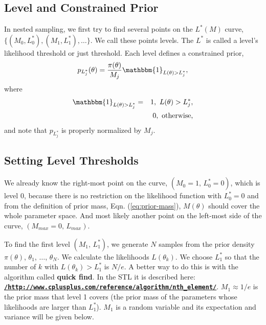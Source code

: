 \documentclass[letterpaper, preprint]{aastex}
\begin{document}
\subsection{Level and Constrained Prior}
In nested sampling, we first try to find several points on the $L^*(M)$ curve, $\{(M_0, L_0^*),(M_1,L_1^*),\ldots\}$. We call these points levels. The $L^*$ is called a level's likelihood threshold or just threshold. Each level defines a constrained prior,
\begin{equation} 
p_{L_j^*}(\theta) = \frac{\pi(\theta)}{M_j}\mathbbm{1}_{L(\theta)>L_j^*},
\label{eq:constrained-prior}
\end{equation}
where
\begin{eqnarray*}
\mathbbm{1}_{L(\theta)>L_j^*} &=& 1,\,\,L(\theta)>L_j^*,\\
& &0,\,\,\mathrm{otherwise},
\end{eqnarray*}
and note that $p_{L_j^*}$ is properly normalized by $M_j$. 

\subsection{Setting Level Thresholds}
We already know the right-most point on the curve, $\left(M_0 = 1,\,L_0^*=0\right)$, which is level 0, because there is no restriction on the likelihood function with $L_0^*=0$ and from the definition of prior mass, Eqn. (\ref{eq:prior-mass}), $M(\theta)$ should cover the whole parameter space. And most likely another point on the left-most side of the curve, $\left(M_{max}=0,\,L_{max}\right)$.

To find the first level $\left(M_1, \,L^*_1\right)$, we generate $N$ samples from the prior density $\pi(\theta)$, $\theta_1$, $\ldots$, $\theta_N$. We calculate the likelihoods $L(\theta_k)$.  We choose $L^*_1$ so that the number of $k$ with $L(\theta_k) > L^*_1$ is $N/e$. A better way to do this is with the algorithm called {\bf quick find}. In the STL it is described here: \href{http://www.cplusplus.com/reference/algorithm/nth_element/}
{\color{blue} \bf \tt /http://www.cplusplus.com/reference/algorithm/nth\_element/}. $M_1\approx1/e$ is the prior mass that level 1 covers (the prior mass of the parameters whose likelihoods are larger than $L_1^*$). $M_1$ is a random variable and its expectation and variance will be given below. 
\end{document}

